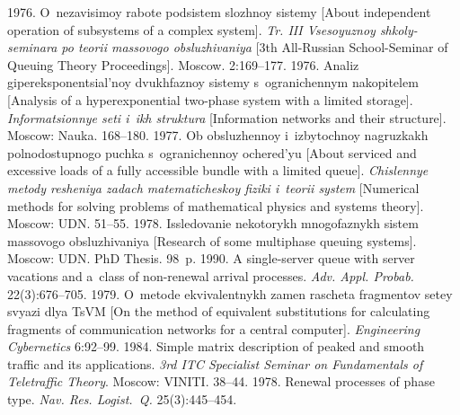   \begin{multicols}{2}

\renewcommand{\bibname}{\protect\rmfamily References}

{\small\frenchspacing
 {%
 \begin{thebibliography}{99}
  
   1976. O~nezavisimoy rabote podsistem slozhnoy sistemy [About independent 
operation of subsystems of a complex system]. \textit{Tr. III Vsesoyuznoy shkoly-seminara po teorii 
massovogo obsluzhivaniya} [3th All-Russian School-Seminar of Queuing Theory Proceedings]. 
Moscow. 2:169--177.
   1976. Analiz gipereksponentsial'noy dvukhfaznoy sistemy 
s~ogranichennym nakopitelem [Analysis of a hyperexponential two-phase system with a limited storage]. 
\textit{Informatsionnye seti i~ikh struktura} [Information networks and their structure]. Moscow: 
Nauka. 
  168--180.
   1977. Ob obsluzhennoy i~izbytochnoy nagruzkakh polnodostupnogo puchka 
s~ogranichennoy ochered'yu [About serviced and excessive loads of a fully accessible bundle with a limited 
queue]. \textit{Chislennye metody resheniya zadach matematicheskoy fiziki i~teorii system} 
[Numerical methods for solving problems of mathematical physics and systems theory]. Moscow: UDN. 
51--55.
   1978. Issledovanie nekotorykh mnogofaznykh sistem massovogo obsluzhivaniya 
[Research of some multiphase queuing systems].  Moscow: UDN.  PhD Thesis. 98~p.
   1990. A single-server queue with 
server vacations and a~class of non-renewal arrival processes. \textit{Adv. Appl. Probab.} 
22(3):676--705.
   1979. O~metode ekvivalentnykh 
zamen rascheta fragmentov setey svyazi dlya TsVM [On the method of equivalent substitutions for 
calculating fragments of communication networks for a central computer]. \textit{Engineering Cybernetics}
 6:92--99.
   1984. Simple matrix description of peaked and smooth 
traffic and its applications. \textit{3rd ITC Specialist Seminar on Fundamentals of Teletraffic Theory}. 
Moscow: VINITI. 
  38--44. 
   1978. Renewal processes of phase type. \textit{Nav. Res. Logist.~Q.} 25(3):445--454.

\end{thebibliography}}}
\end{multicols}
